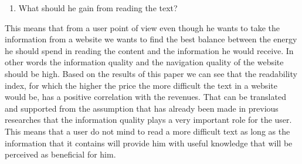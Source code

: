 \documentclass{book}
\begin{document}
\begin{itemize}
\begin{enumerate}
\item What should he gain from reading the text?
\end{enumerate}
This means that from a user point of view even though he wants to take the information from a website we wants to find the best balance between the energy he should spend in reading the content and the information he would receive. In other words the information quality and the navigation quality of the website should be high. Based on the results of this paper we can see that the readability index, for which the higher the price the more difficult the text in a website would be, has a positive correlation with the revenues. That can be translated and supported from the assumption that has already been made in previous researches that the information quality plays a very important role for the user. This means that a user do not mind to read a more difficult text as long as the information that it contains will provide him with useful knowledge that will be perceived as beneficial for him.


\end{itemize}
\end{document}
